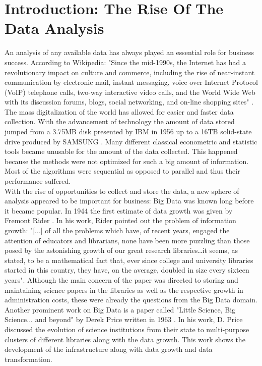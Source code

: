 \documentclass[
  twoside,
  11pt, a4paper,
  footinclude=true,
  headinclude=true,
  cleardoublepage=empty
]{scrreprt}
\begin{document}
        \section{Introduction: The Rise Of The Data Analysis}
        An analysis of any available data has always played an essential role for business success. According to Wikipedia: "Since the mid-1990s, the Internet has had a revolutionary impact on culture and commerce, including the rise of near-instant communication by electronic mail, instant messaging, voice over Internet Protocol (VoIP) telephone calls, two-way interactive video calls, and the World Wide Web with its discussion forums, blogs, social networking, and on-line shopping sites" \cite{wiki:history}. The mass digitalization of the world has allowed for easier and faster data collection. With the advancement of technology the amount of data stored jumped from a 3.75MB disk presented by IBM in 1956 \cite{ibm:storage} up to a 16TB solid-state drive produced by SAMSUNG \cite{article:largestHardDrive}. Many different classical econometric and statistic tools became unusable for the amount of the data collected. This happened because the methods were not optimized for such a big amount of information. Most of the algorithms were sequential as opposed to parallel and thus their performance suffered.\\
        With the rise of opportunities to collect and store the data, a new sphere of analysis appeared to be important for business: Big Data was known long before it became popular. In 1944 the first estimate of data growth was given by Fremont Rider \cite{inproceedings:LibraryResearch}. In his work, Rider pointed out the problem of information growth: "[...] of all the problems which have, of recent years, engaged the attention of educators and librarians, none have been more puzzling than those posed by the astonishing growth of our great research libraries…it seems, as stated, to be a mathematical fact that, ever since college and university libraries started in this country, they have, on the average, doubled in size every sixteen years". Although the main concern of the paper was directed to storing and maintaining science papers in the libraries as well as the respective growth in administration costs, these were already the questions from the Big Data domain. Another prominent work on Big Data is a paper called "Little Science, Big Science... and beyond" by Derek Price written in 1963 \cite{inproceedings:SmallToBigScience}. In his work, D. Price discussed the evolution of science institutions from their state to multi-purpose clusters of different libraries along with the data growth. This work shows the development of the infrastructure along with data growth and data transformation.\\
\end{document}
